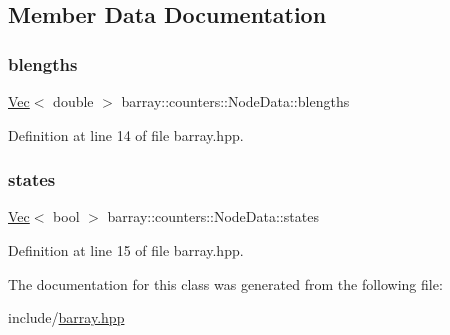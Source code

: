 \subsection{Member Data Documentation}
\mbox{\label{classbarray_1_1counters_1_1_node_data_a6b6fa71584ad100cc4215a4b8170e5d4}} 
\subsubsection{\texorpdfstring{blengths}{blengths}}
{\footnotesize\ttfamily \hyperlink{namespacebarray_1_1counters_a7899949c19d9915ddc164b59004adbd2}{Vec}$<$ double $>$ barray\+::counters\+::\+Node\+Data\+::blengths}



Definition at line 14 of file barray.\+hpp.

\mbox{\label{classbarray_1_1counters_1_1_node_data_ab92b2415dff82a4665a68d3db7bc4305}} 
\subsubsection{\texorpdfstring{states}{states}}
{\footnotesize\ttfamily \hyperlink{namespacebarray_1_1counters_a7899949c19d9915ddc164b59004adbd2}{Vec}$<$ bool $>$ barray\+::counters\+::\+Node\+Data\+::states}



Definition at line 15 of file barray.\+hpp.



The documentation for this class was generated from the following file\+:\begin{DoxyCompactItemize}
\item 
include/\hyperlink{barray_8hpp}{barray.\+hpp}\end{DoxyCompactItemize}
